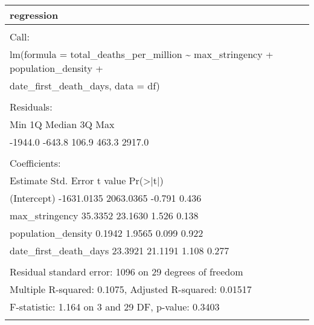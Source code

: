 \documentclass[
]{article}
\begin{document}
\begin{table}
\centering
\begin{tabular}[t]{l}
\hline
regression\\
\hline
\\
\hline
Call:\\
\hline
lm(formula = total\_deaths\_per\_million \textasciitilde{} max\_stringency + population\_density +\\
\hline
date\_first\_death\_days, data = df)\\
\hline
\\
\hline
Residuals:\\
\hline
Min      1Q  Median      3Q     Max\\
\hline
-1944.0  -643.8   106.9   463.3  2917.0\\
\hline
\\
\hline
Coefficients:\\
\hline
Estimate Std. Error t value Pr(>|t|)\\
\hline
(Intercept)           -1631.0135  2063.0365  -0.791    0.436\\
\hline
max\_stringency           35.3352    23.1630   1.526    0.138\\
\hline
population\_density        0.1942     1.9565   0.099    0.922\\
\hline
date\_first\_death\_days    23.3921    21.1191   1.108    0.277\\
\hline
\\
\hline
Residual standard error: 1096 on 29 degrees of freedom\\
\hline
Multiple R-squared:  0.1075,    Adjusted R-squared:  0.01517\\
\hline
F-statistic: 1.164 on 3 and 29 DF,  p-value: 0.3403\\
\hline
\\
\hline
\end{tabular}
\end{table}
\end{document}
